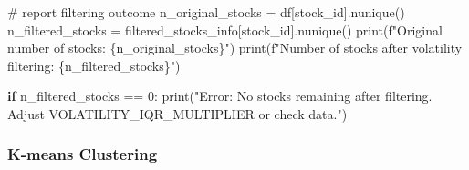 \documentclass[
  letterpaper,
  DIV=11,
  numbers=noendperiod]{scrartcl}
\newenvironment{Shaded}{\begin{snugshade}}{\end{snugshade}}
\newcommand{\BuiltInTok}[1]{\textcolor[rgb]{0.00,0.23,0.31}{#1}}
\newcommand{\CommentTok}[1]{\textcolor[rgb]{0.37,0.37,0.37}{#1}}
\newcommand{\ControlFlowTok}[1]{\textcolor[rgb]{0.00,0.23,0.31}{\textbf{#1}}}
\newcommand{\DecValTok}[1]{\textcolor[rgb]{0.68,0.00,0.00}{#1}}
\newcommand{\NormalTok}[1]{\textcolor[rgb]{0.00,0.23,0.31}{#1}}
\newcommand{\OperatorTok}[1]{\textcolor[rgb]{0.37,0.37,0.37}{#1}}
\newcommand{\SpecialCharTok}[1]{\textcolor[rgb]{0.37,0.37,0.37}{#1}}
\newcommand{\SpecialStringTok}[1]{\textcolor[rgb]{0.13,0.47,0.30}{#1}}
\newcommand{\StringTok}[1]{\textcolor[rgb]{0.13,0.47,0.30}{#1}}
\begin{document}
\begin{Shaded}
\begin{Highlighting}[]
\CommentTok{\# report filtering outcome}
\NormalTok{n\_original\_stocks }\OperatorTok{=}\NormalTok{ df[}\StringTok{\textquotesingle{}stock\_id\textquotesingle{}}\NormalTok{].nunique()}
\NormalTok{n\_filtered\_stocks }\OperatorTok{=}\NormalTok{ filtered\_stocks\_info[}\StringTok{\textquotesingle{}stock\_id\textquotesingle{}}\NormalTok{].nunique()}
\BuiltInTok{print}\NormalTok{(}\SpecialStringTok{f"Original number of stocks: }\SpecialCharTok{\{}\NormalTok{n\_original\_stocks}\SpecialCharTok{\}}\SpecialStringTok{"}\NormalTok{)}
\BuiltInTok{print}\NormalTok{(}\SpecialStringTok{f"Number of stocks after volatility filtering: }\SpecialCharTok{\{}\NormalTok{n\_filtered\_stocks}\SpecialCharTok{\}}\SpecialStringTok{"}\NormalTok{)}

\ControlFlowTok{if}\NormalTok{ n\_filtered\_stocks }\OperatorTok{==} \DecValTok{0}\NormalTok{:}
    \BuiltInTok{print}\NormalTok{(}\StringTok{"Error: No stocks remaining after filtering. Adjust VOLATILITY\_IQR\_MULTIPLIER or check data."}\NormalTok{)}
\end{Highlighting}
\end{Shaded}

\subsubsection{K-means Clustering}\label{k-means-clustering}
\end{document}
